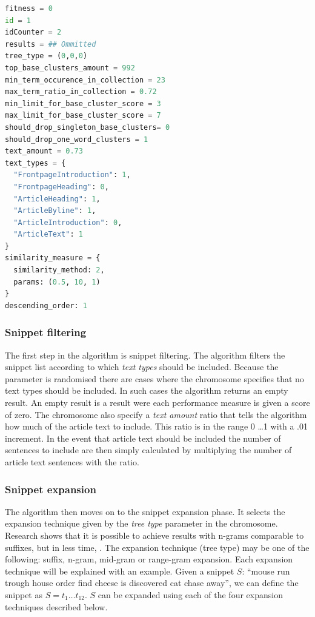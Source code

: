 \begin{lstlisting}[float=ht!, language=python, label=lst:chromosome, caption={An example chromosome}]
fitness = 0
id = 1
idCounter = 2
results = ## Ommitted
tree_type = (0,0,0)
top_base_clusters_amount = 992
min_term_occurence_in_collection = 23
max_term_ratio_in_collection = 0.72
min_limit_for_base_cluster_score = 3
max_limit_for_base_cluster_score = 7
should_drop_singleton_base_clusters= 0
should_drop_one_word_clusters = 1
text_amount = 0.73
text_types = {
  "FrontpageIntroduction": 1,
  "FrontpageHeading": 0,
  "ArticleHeading": 1,
  "ArticleByline": 1,
  "ArticleIntroduction": 0,
  "ArticleText": 1
}
similarity_measure = {
  similarity_method: 2,
  params: (0.5, 10, 1)
}
descending_order: 1
\end{lstlisting}

\subsubsection{Snippet filtering}
\label{subsubsec:snippetfiltering}
The first step in the \CTC algorithm is snippet filtering. The algorithm filters the snippet list according to which \emph{text types} should be included. Because the parameter is randomised there are cases where the chromosome specifies that no text types should be included. In such cases the algorithm returns an empty result. An empty result is a result were each performance measure is given a score of zero. The chromosome also specify a \emph{text amount} ratio that tells the algorithm how much of the article text to include. This ratio is in the range 0 \dots 1 with a .01 increment. In the event that article text should be included the number of sentences to include are then simply calculated by multiplying the number of article text sentences with the ratio.

\subsubsection{Snippet expansion}
\label{subsubsec:snippetexpansion}
The algorithm then moves on to the snippet expansion phase. It selects the expansion technique given by the \emph{tree type} parameter in the chromosome. Research shows that it is possible to achieve results with n-grams comparable to suffixes, but in less time, \parencite{Moe2013compact,Moe2014}. The expansion technique (tree type) may be one of the following: suffix, n-gram, mid-gram or range-gram expansion. Each expansion technique will be explained with an example. Given a snippet \(S\): ``mouse run trough house order find cheese is discovered cat chase away'', we can define the snippet as \(S = t_{1} \dots t_{12}\). \(S\) can be expanded using each of the four expansion techniques described below.

